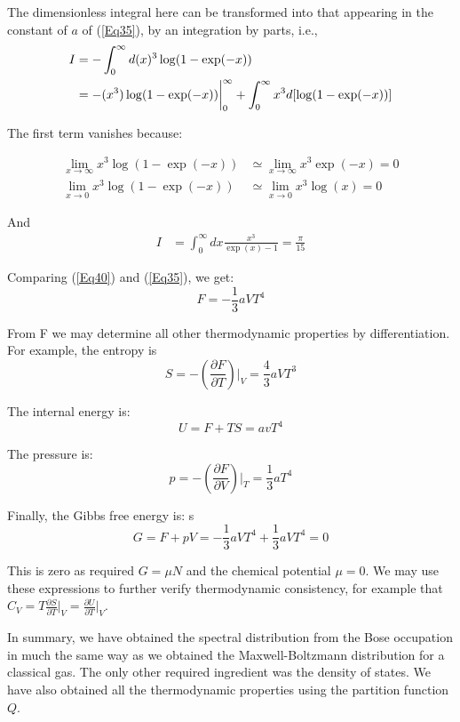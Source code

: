 \documentclass[book.tex]{subfiles}
\begin{document}
The dimensionless integral here can be transformed into that appearing in the constant of $a$ of (\ref{Eq35}), by an integration by parts, i.e., 
\begin{align}\label{Eq41}
I &= -  \int_{0}^{\infty} d(x)^{3} \log(1-\exp(-x)) \notag \\
&= - (x^{3}) \log(1-\exp(-x))\bigg|_{0}^{\infty} + \int_{0}^{\infty} x^{3} d[\log(1-\exp(-x))]
\end{align}

The first term vanishes because:

\begin{align}
\lim_{x \to \infty} x^{3} \log(1-\exp(-x)) &\simeq \lim_{x \to \infty} x^{3} \exp(-x) = 0 \\
\lim_{x \to 0} x^{3} \log(1-\exp(-x)) &\simeq \lim_{x \to 0} x^{3} \log(x) = 0
\end{align}

And
\begin{align}\label{Eq42}
I &= \int_{0}^{\infty} dx \frac{x^{3}}{\exp(x)-1} = \frac{\pi}{15}
\end{align}

Comparing (\ref{Eq40}) and (\ref{Eq35}), we get:
\begin{equation}\label{Eq43}
F = -\frac{1}{3} aVT^{4}
\end{equation}

From F we may determine all other thermodynamic properties by differentiation. For example, the entropy is
\begin{equation}\label{Eq44}
S = -\left(\frac{\partial F}{\partial T}\right) \bigg|_{V} = \frac{4}{3} aVT^{3}
\end{equation}

The internal energy is:
\begin{equation}\label{Eq45}
U = F +TS = avT^{4}
\end{equation}

The pressure is:
\begin{equation}\label{Eq46}
p = -\left(\frac{\partial F}{\partial V}\right) \bigg|_{T}  = \frac{1}{3} aT^{4}
\end{equation}

Finally, the Gibbs free energy is:
 s \textbf{  }
\begin{equation}\label{Eq47}
G = F + pV =  - \frac{1}{3} aVT^{4} + \frac{1}{3} aVT^{4} = 0
\end{equation}

This is zero as required $G=\mu N$ and the chemical potential $\mu=0$. We may use these expressions to further verify thermodynamic consistency, for example that $C_{V} = T\frac{\partial S}{\partial T}\bigg|_{V}= \frac{\partial U}{\partial T}\bigg|_{V}$.

In summary, we have obtained the spectral distribution from the Bose occupation in much the same way as we obtained the Maxwell-Boltzmann distribution for a classical gas. The only other required ingredient was the density of states. We have also obtained all the thermodynamic properties using the partition function $Q$.
\end{document}
